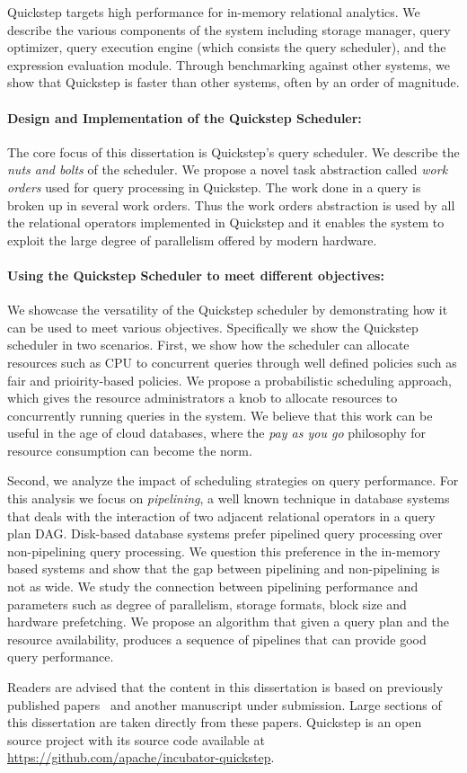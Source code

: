 Quickstep targets high performance for in-memory relational analytics. 
We describe the various components of the system including storage manager, query optimizer, query execution engine (which consists the query scheduler), and the expression evaluation module. 
Through benchmarking against other systems, we show that Quickstep is faster than other systems, often by an order of magnitude.

\paragraph{Design and Implementation of the Quickstep Scheduler:}
The core focus of this dissertation is Quickstep's query scheduler. 
We describe the \textit{nuts and bolts} of the scheduler.
We propose a novel task abstraction called \textit{work orders} used for query processing in Quickstep.
The work done in a query is broken up in several work orders.
Thus the work orders abstraction is used by all the relational operators implemented in Quickstep and it enables the system to exploit the large degree of parallelism offered by modern hardware.

\paragraph{Using the Quickstep Scheduler to meet different objectives:}
We showcase the versatility of the Quickstep scheduler by demonstrating how it can be used to meet various objectives.
Specifically we show the Quickstep scheduler in two scenarios.
First, we show how the scheduler can allocate resources such as CPU to concurrent queries through well defined policies such as fair and prioirity-based policies.
We propose a probabilistic scheduling approach, which gives the resource administrators a knob to allocate resources to concurrently running queries in the system.
We believe that this work can be useful in the age of cloud databases, where the \textit{pay as you go} philosophy for resource consumption can become the norm.

Second, we analyze the impact of scheduling strategies on query performance.
For this analysis we focus on \textit{pipelining}, a well known technique in database systems that deals with the interaction of two adjacent relational operators in a query plan DAG. 
Disk-based database systems prefer pipelined query processing over non-pipelining query processing.
We question this preference in the in-memory based systems and show that the gap between pipelining and non-pipelining is not as wide.
We study the connection between pipelining performance and parameters such as degree of parallelism, storage formats, block size and hardware prefetching.
We propose an algorithm that given a query plan and the resource availability, produces a sequence of pipelines that can provide good query performance.

Readers are advised that the content in this dissertation is based on previously published papers~\cite{quickstep-vldb, original, supplement} and another manuscript under submission.
Large sections of this dissertation are taken directly from these papers. 
Quickstep is an open source project with its source code available at \url{https://github.com/apache/incubator-quickstep}.

